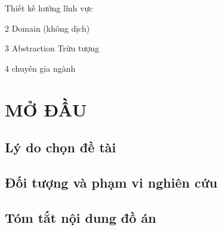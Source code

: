 Thiết kế hướng lĩnh vực

2 Domain (không dịch)

3 Abstraction Trừu tượng

4 chuyên gia ngành

\chapter*{\centering MỞ ĐẦU}


\section*{Lý do chọn đề tài}



\section*{Đối tượng và phạm vi nghiên cứu}



\section*{Tóm tắt nội dung đồ án}

